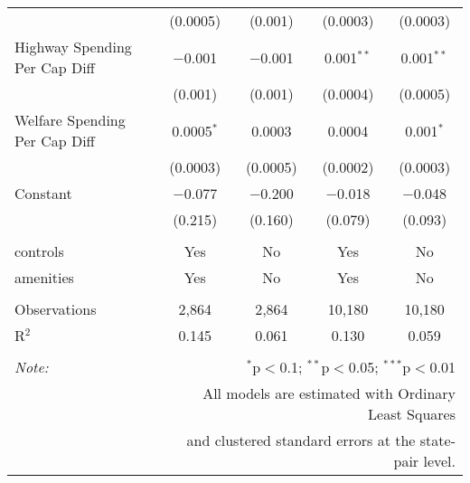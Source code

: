 \begin{table}[!htbp]
\begin{tabular}{@{\extracolsep{5pt}}lcccc}
  & (0.0005) & (0.001) & (0.0003) & (0.0003) \\ 
  Highway Spending Per Cap Diff & $-$0.001 & $-$0.001 & 0.001$^{**}$ & 0.001$^{**}$ \\ 
  & (0.001) & (0.001) & (0.0004) & (0.0005) \\ 
  Welfare Spending Per Cap Diff & 0.0005$^{*}$ & 0.0003 & 0.0004 & 0.001$^{*}$ \\ 
  & (0.0003) & (0.0005) & (0.0002) & (0.0003) \\ 
  Constant & $-$0.077 & $-$0.200 & $-$0.018 & $-$0.048 \\ 
  & (0.215) & (0.160) & (0.079) & (0.093) \\ 
 \hline \\[-1.8ex] 
controls & Yes & No & Yes & No \\ 
amenities & Yes & No & Yes & No \\ 
\hline \\[-1.8ex] 
Observations & 2,864 & 2,864 & 10,180 & 10,180 \\ 
R$^{2}$ & 0.145 & 0.061 & 0.130 & 0.059 \\ 
\hline 
\hline \\[-1.8ex] 
\textit{Note:}  & \multicolumn{4}{r}{$^{*}$p$<$0.1; $^{**}$p$<$0.05; $^{***}$p$<$0.01} \\ 
 & \multicolumn{4}{r}{All models are estimated with Ordinary Least Squares} \\ 
 & \multicolumn{4}{r}{and clustered standard errors at the state-pair level.} \\ 
\end{tabular} 
\end{table} 
